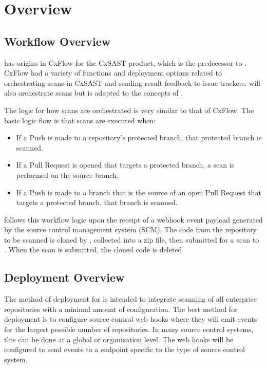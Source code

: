 \chapter{Overview}\label{sec:overview}

\section{Workflow Overview}

\cxoneflow has origins in CxFlow for the CxSAST product, which is the predecessor to \cxone.  CxFlow
had a variety of functions and deployment options related to orchestrating scans in CxSAST and sending
result feedback to issue trackers.  \cxoneflow will also orchestrate scans but is adapted to the
concepts of \cxonens.

The \cxoneflow logic for how scans are orchestrated is very similar to that of CxFlow.  The basic
logic flow is that scans are executed when:

\begin{itemize}
    \item If a Push is made to a repository's protected branch, that protected branch is scanned.
    \item If a Pull Request is opened that targets a protected branch, a scan is performed on
    the source branch.
    \item If a Push is made to a branch that is the source of an open Pull Request that targets
    a protected branch, that branch is scanned.
\end{itemize}


\cxoneflow follows this workflow logic upon the receipt of a webhook event payload generated by the
source control management system (SCM). The code from the repository to be scanned is cloned by \cxoneflowns, 
collected into a zip file, then submitted for a scan to \cxonens.  When the scan is submitted, the cloned
code is deleted.


\section{Deployment Overview}

The method of deployment for \cxoneflow is intended to integrate scanning of all enterprise repositories
with a minimal amount of configuration.  The best method for deployment is to configure source control web
hooks where they will emit events for the largest possible number of repositories.  In many source control
systems, this can be done at a global or organization level.  The web hooks will be configured to send events
to a \cxoneflow endpoint specific to the type of source control system.

